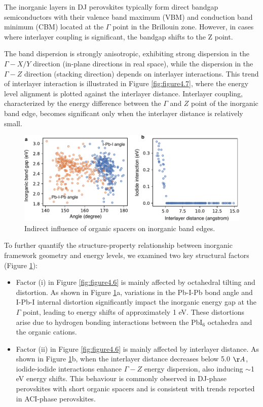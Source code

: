 The inorganic layers in DJ perovskites typically form direct bandgap semiconductors with their valence band maximum (VBM) and conduction band minimum (CBM) located at the $\Gamma$ point in the Brillouin zone. However, in cases where interlayer coupling is significant, the bandgap shifts to the Z point. 

The band dispersion is strongly anisotropic, exhibiting strong dispersion in the $\Gamma-X/Y$ direction (in-plane directions in real space), while the dispersion in the $\Gamma-Z$ direction (stacking direction) depends on interlayer interactions. This trend of interlayer interaction is illustrated in Figure \ref{fig:figure4.7}, where the energy level alignment is plotted against the interlayer distance. Interlayer coupling, characterized by the energy difference between the $\Gamma$ and $Z$ point of the inorganic band edge, becomes significant only when the interlayer distance is relatively small.

\begin{figure}[htbp]
    \centering
    \includegraphics[width=\textwidth]{figures/HT-ML/figure4-8.pdf}
    \caption{Indirect influence of organic spacers on inorganic band edges.}
    \label{fig:figure4.8}
\end{figure}

To further quantify the structure-property relationship between inorganic framework geometry and energy levels, we examined two key structural factors (Figure \ref{fig:figure4.8}):

\begin{itemize}
    \item Factor (i) in Figure \ref{fig:figure4.6} is mainly affected by octahedral tilting and distortion. As shown in Figure \ref{fig:figure4.8}a, variations in the Pb-I-Pb bond angle and I-Pb-I internal distortion significantly impact the inorganic energy gap at the $\Gamma$ point, leading to energy shifts of approximately 1 eV. These distortions arise due to hydrogen bonding interactions between the PbI$_6$ octahedra and the organic cations.
    \item Factor (ii) in Figure \ref{fig:figure4.6} is mainly affected by interlayer distance. As shown in Figure \ref{fig:figure4.8}b, when the interlayer distance decreases below 5.0 $\AA$, iodide-iodide interactions enhance $\Gamma-Z$ energy dispersion, also inducing $\sim$1 eV energy shifts. This behaviour is commonly observed in DJ-phase perovskites with short organic spacers and is consistent with trends reported in ACI-phase perovskites\cite{RN242,RN31}.
\end{itemize}

